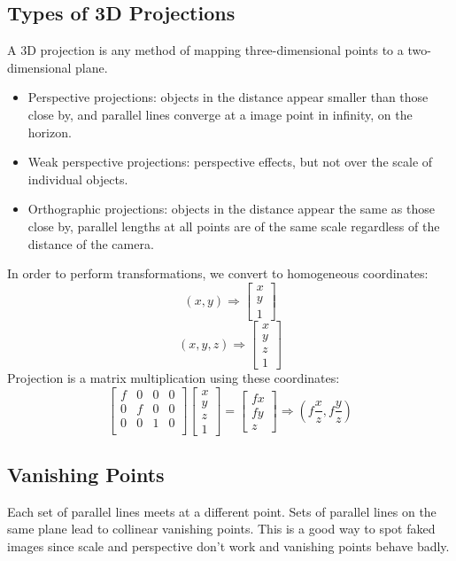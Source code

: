 \documentclass{math}
\begin{document}
\subsection*{Types of 3D Projections}
A 3D projection is any method of mapping three-dimensional points to a
two-dimensional plane.
\begin{itemize}
  \item Perspective projections: objects in the distance appear smaller than
    those close by, and parallel lines converge at a image point in infinity, on
    the horizon.
  \item Weak perspective projections: perspective effects, but not over the
    scale of individual objects.
  \item Orthographic projections: objects in the distance appear the same as
    those close by, parallel lengths at all points are of the same scale
    regardless of the distance of the camera.
\end{itemize}
In order to perform transformations, we convert to homogeneous coordinates:
\[ (x,y) \Rightarrow \begin{bmatrix}x \\ y \\ 1\end{bmatrix} \]
\[ (x,y,z) \Rightarrow \begin{bmatrix}x \\ y \\ z \\ 1\end{bmatrix} \]
Projection is a matrix multiplication using these coordinates:
\[ \begin{bmatrix}
  f & 0 & 0 & 0 \\
  0 & f & 0 & 0 \\
  0 & 0 & 1 & 0 \\
\end{bmatrix}\begin{bmatrix}
  x \\ y \\ z \\ 1
\end{bmatrix} = \begin{bmatrix}
  fx \\ fy \\ z
\end{bmatrix} \Rightarrow (f\frac{x}{z}, f\frac{y}{z}) \]

\subsection*{Vanishing Points}
Each set of parallel lines meets at a different point. Sets of parallel lines on
the same plane lead to collinear vanishing points. This is a good way to spot
faked images since scale and perspective don't work and vanishing points behave
badly.
\end{document}
